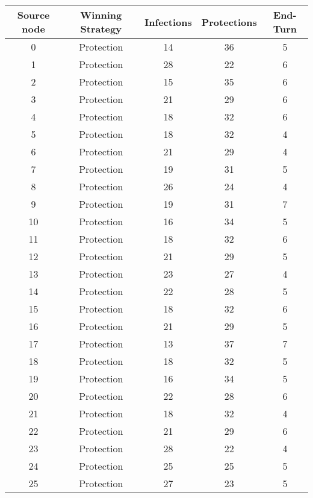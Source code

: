 \documentclass[results.tex]{subfiles}
\begin{document}
\begin{center}
  \begin{tabular}{| c || c | c | c | c |}
    \hline
    {\bfseries Source node} & {\bfseries Winning Strategy} & {\bfseries Infections} & {\bfseries Protections} & {\bfseries End-Turn} \\  %
    \hline\hline
    0 & Protection & 14 & 36 & 5 \\ 
    \hline
    1 & Protection & 28 & 22 & 6 \\ 
    \hline
    2 & Protection & 15 & 35 & 6 \\ 
    \hline
    3 & Protection & 21 & 29 & 6 \\ 
    \hline
    4 & Protection & 18 & 32 & 6 \\ 
    \hline
    5 & Protection & 18 & 32 & 4 \\ 
    \hline
    6 & Protection & 21 & 29 & 4 \\ 
    \hline
    7 & Protection & 19 & 31 & 5 \\ 
    \hline
    8 & Protection & 26 & 24 & 4 \\ 
    \hline
    9 & Protection & 19 & 31 & 7 \\ 
    \hline
    10 & Protection & 16 & 34 & 5 \\ 
    \hline
    11 & Protection & 18 & 32 & 6 \\ 
    \hline
    12 & Protection & 21 & 29 & 5 \\ 
    \hline
    13 & Protection & 23 & 27 & 4 \\ 
    \hline
    14 & Protection & 22 & 28 & 5 \\ 
    \hline
    15 & Protection & 18 & 32 & 6 \\ 
    \hline
    16 & Protection & 21 & 29 & 5 \\ 
    \hline
    17 & Protection & 13 & 37 & 7 \\ 
    \hline
    18 & Protection & 18 & 32 & 5 \\ 
    \hline
    19 & Protection & 16 & 34 & 5 \\ 
    \hline
    20 & Protection & 22 & 28 & 6 \\ 
    \hline
    21 & Protection & 18 & 32 & 4 \\ 
    \hline
    22 & Protection & 21 & 29 & 6 \\ 
    \hline
    23 & Protection & 28 & 22 & 4 \\ 
    \hline
    24 & Protection & 25 & 25 & 5 \\ 
    \hline
    25 & Protection & 27 & 23 & 5 \\ 

\end{tabular}
\end{center}
\end{document}
